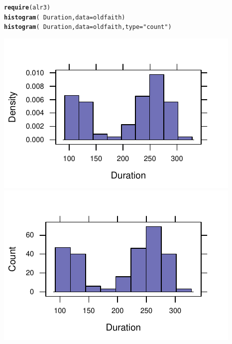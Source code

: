 \documentclass[twoside]{book}\usepackage[]{graphicx}\usepackage[]{xcolor}
\makeatletter
\def\maxwidth{ %
  \ifdim\Gin@nat@width>\linewidth
    \linewidth
  \else
    \Gin@nat@width
  \fi
}
\newcommand{\hlstr}[1]{\textcolor[rgb]{0.192,0.494,0.8}{#1}}%
\newcommand{\hlopt}[1]{\textcolor[rgb]{0,0,0}{#1}}%
\newcommand{\hlstd}[1]{\textcolor[rgb]{0.345,0.345,0.345}{#1}}%
\newcommand{\hlkwc}[1]{\textcolor[rgb]{0.333,0.667,0.333}{#1}}%
\newcommand{\hlkwd}[1]{\textcolor[rgb]{0.737,0.353,0.396}{\textbf{#1}}}%
\newenvironment{kframe}{%
 \def\at@end@of@kframe{}%
 \ifinner\ifhmode%
  \def\at@end@of@kframe{\end{minipage}}%
  \begin{minipage}{\columnwidth}%
 \fi\fi%
 \def\FrameCommand##1{\hskip\@totalleftmargin \hskip-\fboxsep
 \colorbox{shadecolor}{##1}\hskip-\fboxsep
     \hskip-\linewidth \hskip-\@totalleftmargin \hskip\columnwidth}%
 \MakeFramed {\advance\hsize-\width
   \@totalleftmargin\z@ \linewidth\hsize
   \@setminipage}}%
 {\par\unskip\endMakeFramed%
 \at@end@of@kframe}
\newenvironment{knitrout}{}{} %
\makeatother
\begin{document}
\begin{knitrout}
\color{fgcolor}\begin{kframe}
\begin{alltt}
\hlkwd{require}\hlstd{(alr3)}
\hlkwd{histogram}\hlstd{(}\hlopt{~}\hlstd{Duration,} \hlkwc{data} \hlstd{= oldfaith)}
\hlkwd{histogram}\hlstd{(}\hlopt{~}\hlstd{Duration,} \hlkwc{data} \hlstd{= oldfaith,} \hlkwc{type} \hlstd{=} \hlstr{"count"}\hlstd{)}
\end{alltt}
\end{kframe}

{\centering \includegraphics[width=\maxwidth]{figures/fig-histograms-count-density-1} 
\includegraphics[width=\maxwidth]{figures/fig-histograms-count-density-2} 

}



\end{knitrout}
\end{document}
